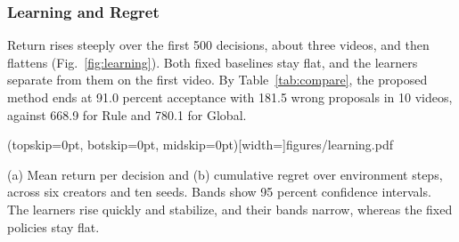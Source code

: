\documentclass{ieeeaccess}
\begin{document}
\subsubsection{Learning and Regret}
Return rises steeply over the first 500 decisions, about three videos, and then flattens (Fig.~\ref{fig:learning}). Both fixed baselines stay flat, and the learners separate from them on the first video. By Table~\ref{tab:compare}, the proposed method ends at 91.0 percent acceptance with 181.5 wrong proposals in 10 videos, against 668.9 for Rule and 780.1 for Global.

\Figure[t!](topskip=0pt, botskip=0pt, midskip=0pt)[width=\textwidth]{figures/learning.pdf}
{\parbox[t]{0.91\textwidth}{\raggedright (a) Mean return per decision and (b) cumulative regret over environment steps, across six creators and ten seeds. Bands show 95 percent confidence intervals. The learners rise quickly and stabilize, and their bands narrow, whereas the fixed policies stay flat.}\label{fig:learning}}
\end{document}
